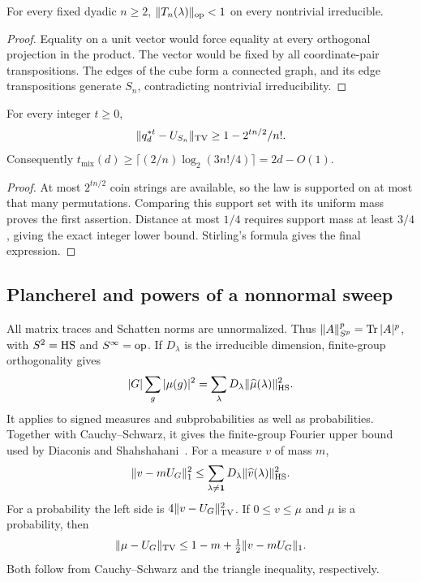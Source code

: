 \begin{lemma}\label{lem:finitegap}
For every fixed dyadic $n\ge2$, $\|T_n(\lambda)\|_{\mathrm{op}}<1$ on every nontrivial irreducible.
\end{lemma}
\begin{proof}
Equality on a unit vector would force equality at every orthogonal projection in the product. The vector would be fixed by all coordinate-pair transpositions. The edges of the cube form a connected graph, and its edge transpositions generate $S_n$, contradicting nontrivial irreducibility.
\end{proof}


\begin{lemma}\label{lem:support}
For every integer $t\ge0$,
\[
 \|q_d^{*t}-U_{S_n}\|_{\mathrm{TV}}\ge1-2^{tn/2}/n!.
\]
Consequently $t_{\mathrm{mix}}(d)\ge\lceil(2/n)\log_2(3n!/4)\rceil=2d-O(1)$.
\end{lemma}
\begin{proof}
At most $2^{tn/2}$ coin strings are available, so the law is supported on at most that many permutations. Comparing this support set with its uniform mass proves the first assertion. Distance at most $1/4$ requires support mass at least $3/4$, giving the exact integer lower bound. Stirling's formula gives the final expression.
\end{proof}

\subsection{Plancherel and powers of a nonnormal sweep}
All matrix traces and Schatten norms are unnormalized. Thus $\|A\|_{S^p}^p=\operatorname{Tr}|A|^p$, with $S^2=\mathrm{HS}$ and $S^\infty=\mathrm{op}$. If $D_\lambda$ is the irreducible dimension, finite-group orthogonality gives
\[
 |G|\sum_g|\mu(g)|^2=\sum_\lambda D_\lambda\|\widehat\mu(\lambda)\|_{\mathrm{HS}}^2.
\]
It applies to signed measures and subprobabilities as well as probabilities.
Together with Cauchy--Schwarz, it gives the finite-group Fourier upper
bound used by Diaconis and Shahshahani~\cite[Section 2, Lemma 2;
Section 3, Lemma 14]{DiaconisShahshahani1981}. For a measure $v$ of mass $m$,
\begin{equation}\label{eq:plancherel}
 \|v-mU_G\|_1^2\le
 \sum_{\lambda\ne\mathbf1}D_\lambda\|\widehat v(\lambda)\|_{\mathrm{HS}}^2.
\end{equation}
For a probability the left side is $4\|v-U_G\|_{\mathrm{TV}}^2$. If $0\le v\le\mu$ and $\mu$ is a probability, then
\begin{equation}\label{eq:lostmass}
 \|\mu-U_G\|_{\mathrm{TV}}\le1-m+\tfrac12\|v-mU_G\|_1.
\end{equation}
Both follow from Cauchy--Schwarz and the triangle inequality, respectively.

